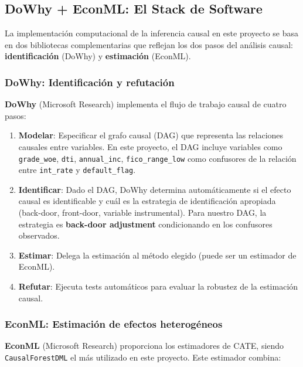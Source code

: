 \documentclass[
  spanish,
  11pt,
  letterpaper,
]{scrbook}
\theoremstyle{plain}
\theoremstyle{remark}
\begin{document}
\subsection{DoWhy + EconML: El Stack de
Software}\label{sec-dowhy-econml}

La implementación computacional de la inferencia causal en este proyecto
se basa en dos bibliotecas complementarias que reflejan los dos pasos
del análisis causal: \textbf{identificación} (DoWhy) y
\textbf{estimación} (EconML).

\subsubsection{DoWhy: Identificación y
refutación}\label{dowhy-identificaciuxf3n-y-refutaciuxf3n}

\textbf{DoWhy} (Microsoft Research) implementa el flujo de trabajo
causal de cuatro pasos:

\begin{enumerate}
\def\labelenumi{\arabic{enumi}.}
\item
  \textbf{Modelar}: Especificar el grafo causal (DAG) que representa las
  relaciones causales entre variables. En este proyecto, el DAG incluye
  variables como \texttt{grade\_woe}, \texttt{dti},
  \texttt{annual\_inc}, \texttt{fico\_range\_low} como confusores de la
  relación entre \texttt{int\_rate} y \texttt{default\_flag}.
\item
  \textbf{Identificar}: Dado el DAG, DoWhy determina automáticamente si
  el efecto causal es identificable y cuál es la estrategia de
  identificación apropiada (back-door, front-door, variable
  instrumental). Para nuestro DAG, la estrategia es \textbf{back-door
  adjustment} condicionando en los confusores observados.
\item
  \textbf{Estimar}: Delega la estimación al método elegido (puede ser un
  estimador de EconML).
\item
  \textbf{Refutar}: Ejecuta tests automáticos para evaluar la robustez
  de la estimación causal.
\end{enumerate}

\subsubsection{EconML: Estimación de efectos
heterogéneos}\label{econml-estimaciuxf3n-de-efectos-heteroguxe9neos}

\textbf{EconML} (Microsoft Research) proporciona los estimadores de
CATE, siendo \texttt{CausalForestDML} el más utilizado en este proyecto.
Este estimador combina:
\end{document}
